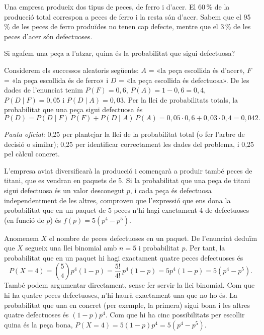 Una empresa produeix dos tipus de peces, de ferro i d'acer. El 60\,\% de la producció total correspon a peces
de ferro i la resta són d'acer. Sabem que el 95\,\% de les peces de ferro produïdes no tenen cap defecte,
mentre que el 3\,\% de les peces d'acer són defectuoses.

\begin{apartats}

Si agafem una peça a l'atzar, quina és la probabilitat que sigui defectuosa?

\begin{solucio}
Considerem els successos aleatoris següents: $A$ = «la peça escollida és d'acer», $F$ = «la peça escollida és
de ferro» i $D$ = «la peça escollida és defectuosa». De les dades de l'enunciat tenim $P(F)=0{,}6$,
$P(A)=1-0{,}6=0{,}4$, $P(D\mid F)=0{,}05$ i $P(D\mid A)=0{,}03$. Per la llei de probabilitats totals, la
probabilitat que una peça sigui defectuosa és
\[
P(D)=P(D\mid F)\,P(F)+P(D\mid A)\,P(A)=0{,}05\cdot0{,}6+0{,}03\cdot0{,}4=0{,}042 .
\]

\textit{Pauta oficial:} 0,25 per plantejar la llei de la probabilitat total (o fer l'arbre de decisió o
similar); 0,25 per identificar correctament les dades del problema, i 0,25 pel càlcul concret.
\end{solucio}

L'empresa aviat diversificarà la producció i començarà a produir també peces de titani, que es vendran en
paquets de 5. Si la probabilitat que una peça de titani sigui defectuosa és un valor desconegut $p$, i cada
peça és defectuosa independentment de les altres, comproveu que l'expressió que ens dona la probabilitat que
en un paquet de 5 peces n'hi hagi exactament 4 de defectuoses (en funció de $p$) és $f(p)=5\left(p^4-p^5\right)$.

\begin{solucio}
Anomenem $X$ el nombre de peces defectuoses en un paquet. De l'enunciat deduïm que $X$ segueix una llei
binomial amb $n=5$ i probabilitat $p$. Per tant, la probabilitat que en un paquet hi hagi exactament quatre
peces defectuoses és
\[
P(X=4)=\binom54p^4(1-p)=\frac{5!}{4!}\,p^4(1-p)=5p^4(1-p)=5\left(p^4-p^5\right).
\]
També podem argumentar directament, sense fer servir la llei binomial. Com que hi ha quatre peces
defectuoses, n'hi haurà exactament una que no ho és. La probabilitat que una en concret (per exemple, la
primera) sigui bona i les altres quatre defectuoses és $(1-p)p^4$. Com que hi ha cinc possibilitats per
escollir quina és la peça bona, $P(X=4)=5(1-p)p^4=5\left(p^4-p^5\right)$.


\end{solucio}
\end{apartats}
